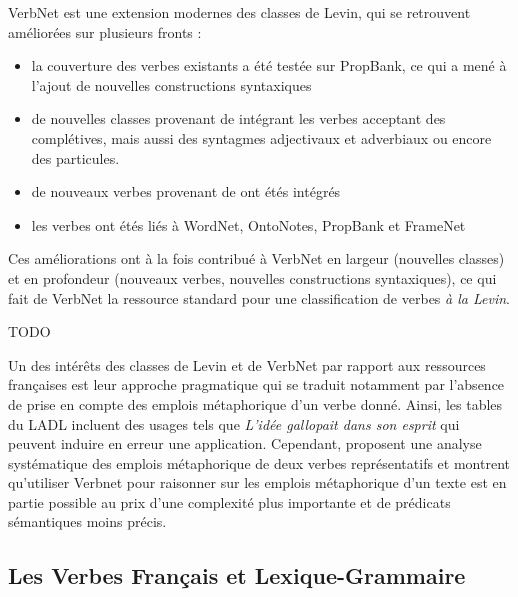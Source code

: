 VerbNet est une extension modernes des classes de Levin, qui se retrouvent
améliorées sur plusieurs fronts :

\begin{itemize}

    \item la couverture des verbes existants a été testée sur PropBank, ce qui
        a mené à l'ajout de nouvelles constructions syntaxiques

    \item de nouvelles classes provenant de \cite{korhonen2004extended}
        intégrant les verbes acceptant des complétives, mais aussi des
        syntagmes adjectivaux et adverbiaux ou encore des particules.

    \item de nouveaux verbes provenant de \cite{dorr2001lcs} ont étés intégrés

    \item les verbes ont étés liés à WordNet, OntoNotes, PropBank et FrameNet
        \citep{palmer2009semlink}

\end{itemize}

Ces améliorations ont à la fois contribué à VerbNet en largeur (nouvelles
classes) et en profondeur (nouveaux verbes, nouvelles constructions
syntaxiques), ce qui fait de VerbNet la ressource standard pour une
classification de verbes \textit{à la Levin}.

TODO

Un des intérêts des classes de Levin et de VerbNet par rapport aux ressources
françaises est leur approche pragmatique qui se traduit notamment par l'absence
de prise en compte des emplois métaphorique d'un verbe donné. Ainsi, les tables
du LADL incluent des usages tels que \textit{L'idée gallopait dans son esprit}
qui peuvent induire en erreur une application. Cependant,
\cite{brown2012semantic} proposent une analyse systématique des emplois
métaphorique de deux verbes représentatifs et montrent qu'utiliser Verbnet pour
raisonner sur les emplois métaphorique d'un texte est en partie possible au
prix d'une complexité plus importante et de prédicats sémantiques moins précis.


\subsection{Les Verbes Français et Lexique-Grammaire}


